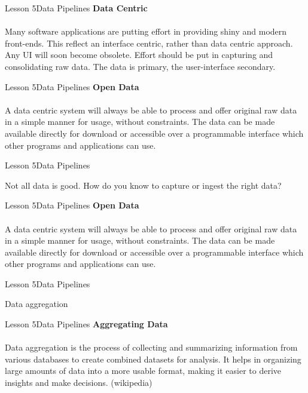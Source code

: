 \documentclass[aspectratio=1610]{beamer}
\begin{document}
\begin{frame}{Lesson 5}{Data Pipelines}
\LARGE
\textbf{Data Centric}\\~\\
Many software applications are putting effort in providing shiny and 
modern front-ends. This reflect an interface centric, rather than 
data centric approach. Any UI will soon become obsolete. Effort 
should be put in capturing and consolidating raw data. The data is 
primary, the user-interface secondary.
\end{frame}



\begin{frame}{Lesson 5}{Data Pipelines}
\LARGE
\textbf{Open Data}\\~\\
A data centric system will always be able to process and offer 
original raw data in a simple manner for usage, without constraints. 
The data can be made available directly for download or accessible 
over a programmable interface which other programs and applications 
can use.
\end{frame}




\begin{frame}{Lesson 5}{Data Pipelines}
\Huge
\begin{center}
Not all data is good. How do you know to capture or ingest the right 
data? 
\end{center}
\end{frame}


\begin{frame}{Lesson 5}{Data Pipelines}
\LARGE
\textbf{Open Data}\\~\\
A data centric system will always be able to process and offer 
original raw data in a simple manner for usage, without constraints. 
The data can be made available directly for download or accessible 
over a programmable interface which other programs and applications 
can use.
\end{frame}


\begin{frame}{Lesson 5}{Data Pipelines}
\Huge
\begin{center}
Data aggregation
\end{center}
\end{frame}



\begin{frame}{Lesson 5}{Data Pipelines}
\LARGE
\textbf{Aggregating Data}\\~\\
Data aggregation is the process of collecting and summarizing 
information from various databases to create combined datasets for 
analysis. It helps in organizing large amounts of data into a more 
usable format, making it easier to derive insights and make 
decisions. (wikipedia)
\end{frame}
\end{document}
